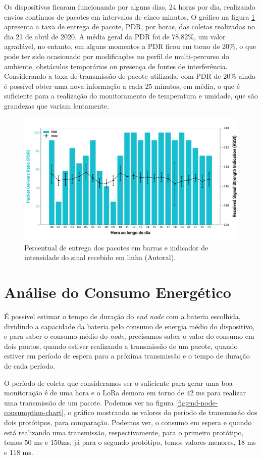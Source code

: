 Os dispositivos ficaram funcionando por alguns dias, 24 horas por dia, realizando envios contínuos de pacotes em intervalos de cinco minutos. O gráfico na figura \ref{fig:21-04-2020-pdr-rssi} apresenta a taxa de entrega de pacote, PDR, por horas, das coletas realizadas no dia 21 de abril de 2020. A média geral da PDR foi de 78,82\%, um valor agradável, no entanto, em alguns momentos a PDR ficou em torno de 20\%, o que pode ter sido ocasionado por modificações no perfil de multi-percurso do ambiente, obstáculos temporários ou presença de fontes de interferência. Considerando a taxa de transmissão de pacote utilizada, com PDR de 20\% ainda é possível obter uma nova informação a cada 25 minutos, em média, o que é suficiente para a realização do monitoramento de temperatura e umidade, que são grandezas que variam lentamente.

\begin{figure}[H]
  \centering
  \includegraphics[width=.80\textwidth]{assets/21-04-2020-pdr-rssi.png} 
  \caption{Percentual de entrega dos pacotes em barras e indicador de intensidade do sinal recebido em linha (Autoral).}
  \label{fig:21-04-2020-pdr-rssi} 
\end{figure}

\section{Análise do Consumo Energético}
\label{result:consumo}
É possível estimar o tempo de duração do \textit{end node} com a bateria escolhida, dividindo a capacidade da bateria pelo consumo de energia médio do dispositivo, e para saber o consumo médio do \textit{node}, precisamos saber o valor do consumo em dois pontos, quando estiver realizando a transmissão de um pacote, quando estiver em período de espera para a próxima transmissão e o tempo de duração de cada período.

O período de coleta que consideramos ser o suficiente para gerar uma boa monitoração é de uma hora e o LoRa demora em torno de 42 ms para realizar uma transmissão de um pacote. Podemos ver na figura \ref{fig:end-node-consumption-chart}, o gráfico mostrando os valores do período de transmissão dos dois protótipos, para comparação. Podemos ver, o consumo em espera e quando está realizando uma transmissão, respectivamente, para o primeiro protótipo, temos 50 ms e 150ms, já para o segundo protótipo, temos valores menores, 18 ms e 118 ms.

